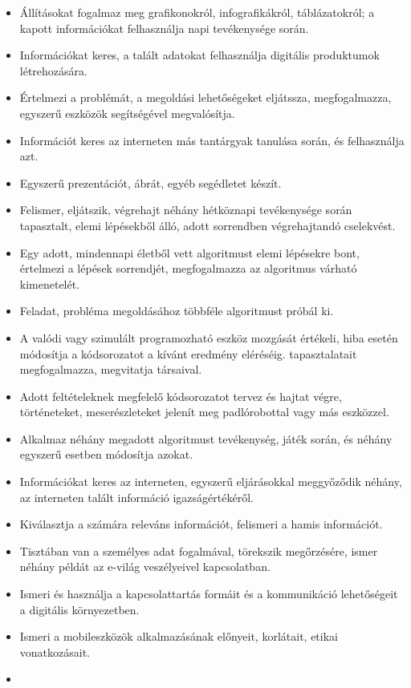 \begin{itemize}
\item
  Állításokat fogalmaz meg grafikonokról, infografikákról,
  táblázatokról; a kapott információkat felhasználja napi tevékenysége
  során.
\item
  Információkat keres, a talált adatokat felhasználja digitális
  produktumok létrehozására.
\item
  Értelmezi a problémát, a megoldási lehetőségeket eljátssza,
  megfogalmazza, egyszerű eszközök segítségével megvalósítja.
\item
  Információt keres az interneten más tantárgyak tanulása során, és
  felhasználja azt.
\item
  Egyszerű prezentációt, ábrát, egyéb segédletet készít.
\item
  Felismer, eljátszik, végrehajt néhány hétköznapi tevékenysége során
  tapasztalt, elemi lépésekből álló, adott sorrendben végrehajtandó
  cselekvést.
\item
  Egy adott, mindennapi életből vett algoritmust elemi lépésekre bont,
  értelmezi a lépések sorrendjét, megfogalmazza az algoritmus várható
  kimenetelét.
\item
  Feladat, probléma megoldásához többféle algoritmust próbál ki.
\item
  A valódi vagy szimulált programozható eszköz mozgását értékeli, hiba
  esetén módosítja a kódsorozatot a kívánt eredmény eléréséig.
  tapasztalatait megfogalmazza, megvitatja társaival.
\item
  Adott feltételeknek megfelelő kódsorozatot tervez és hajtat végre,
  történeteket, meserészleteket jelenít meg padlórobottal vagy más
  eszközzel.
\item
  Alkalmaz néhány megadott algoritmust tevékenység, játék során, és
  néhány egyszerű esetben módosítja azokat.
\item
  Információkat keres az interneten, egyszerű eljárásokkal meggyőződik
  néhány, az interneten talált információ igazságértékéről.
\item
  Kiválasztja a számára releváns információt, felismeri a hamis
  információt.
\item
  Tisztában van a személyes adat fogalmával, törekszik megőrzésére,
  ismer néhány példát az e-világ veszélyeivel kapcsolatban.
\item
  Ismeri és használja a kapcsolattartás formáit és a kommunikáció
  lehetőségeit a digitális környezetben.
\item
  Ismeri a mobileszközök alkalmazásának előnyeit, korlátait, etikai
  vonatkozásait.
\item

\end{itemize}
